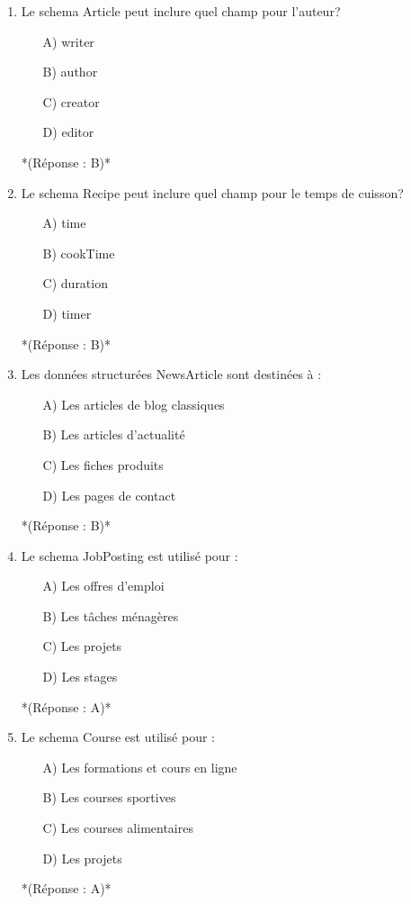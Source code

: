 \documentclass[12pt,a4paper,twoside]{report}
\begin{document}
\begin{enumerate}
\item Le schema Article peut inclure quel champ pour l'auteur?
\begin{itemize}
\item[A)] writer
\item[B)] author
\item[C)] creator
\item[D)] editor
\end{itemize}
*(Réponse : B)*

\item Le schema Recipe peut inclure quel champ pour le temps de cuisson?
\begin{itemize}
\item[A)] time
\item[B)] cookTime
\item[C)] duration
\item[D)] timer
\end{itemize}
*(Réponse : B)*

\item Les données structurées NewsArticle sont destinées à :
\begin{itemize}
\item[A)] Les articles de blog classiques
\item[B)] Les articles d'actualité
\item[C)] Les fiches produits
\item[D)] Les pages de contact
\end{itemize}
*(Réponse : B)*

\item Le schema JobPosting est utilisé pour :
\begin{itemize}
\item[A)] Les offres d'emploi
\item[B)] Les tâches ménagères
\item[C)] Les projets
\item[D)] Les stages
\end{itemize}
*(Réponse : A)*

\item Le schema Course est utilisé pour :
\begin{itemize}
\item[A)] Les formations et cours en ligne
\item[B)] Les courses sportives
\item[C)] Les courses alimentaires
\item[D)] Les projets
\end{itemize}
*(Réponse : A)*


\end{enumerate}
\end{document}
